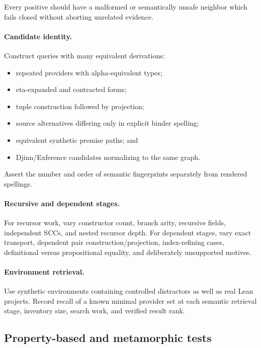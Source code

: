 \documentclass[11pt]{article}
\newcommand{\Djinn}{Djinn}
\newcommand{\Exference}{Exference}
\begin{document}
Every positive should have a malformed or semantically unsafe neighbor which
fails closed without aborting unrelated evidence.

\paragraph{Candidate identity.}

Construct queries with many equivalent derivations:

\begin{itemize}
  \item repeated providers with alpha-equivalent types;
  \item eta-expanded and contracted forms;
  \item tuple construction followed by projection;
  \item source alternatives differing only in explicit binder spelling;
  \item equivalent synthetic premise paths; and
  \item \Djinn{}/\Exference{} candidates normalizing to the same graph.
\end{itemize}

Assert the number and order of semantic fingerprints separately from rendered
spellings.

\paragraph{Recursive and dependent stages.}

For recursor work, vary constructor count, branch arity, recursive fields,
independent SCCs, and nested recursor depth.  For dependent stages, vary exact
transport, dependent pair construction/projection, index-refining cases,
definitional versus propositional equality, and deliberately unsupported
motives.

\paragraph{Environment retrieval.}

Use synthetic environments containing controlled distractors as well as real
Lean projects.  Record recall of a known minimal provider set at each semantic
retrieval stage, inventory size, search work, and verified result rank.

\subsection{Property-based and metamorphic tests}
\end{document}
